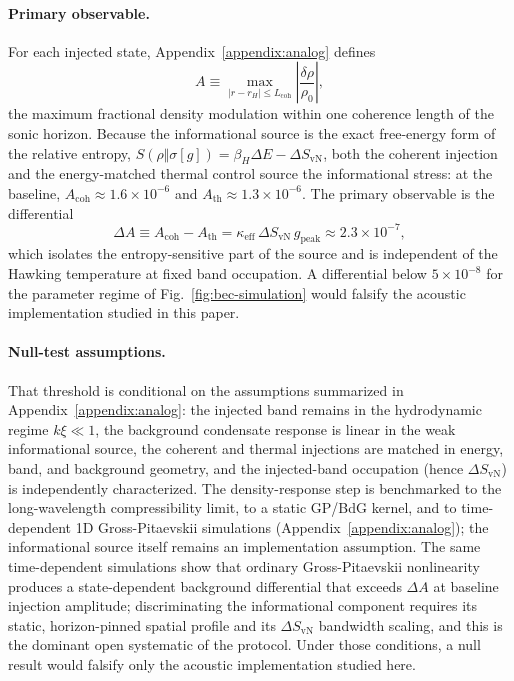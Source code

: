 \documentclass[aps,prd,twocolumn,superscriptaddress,nofootinbib,floatfix]{revtex4-2}
\begin{document}
\paragraph{Primary observable.}
For each injected state, Appendix~\ref{appendix:analog} defines
\begin{equation}
    A \equiv \max_{|r-r_H|\le L_{\mathrm{coh}}}\left|\frac{\delta \rho}{\rho_0}\right|,
\end{equation}
the maximum fractional density modulation within one coherence length of the sonic horizon. Because the informational source is the exact free-energy form of the relative entropy, $S(\rho\Vert\sigma[g]) = \beta_H \Delta E - \Delta S_{\mathrm{vN}}$, both the coherent injection and the energy-matched thermal control source the informational stress: at the baseline, $A_{\mathrm{coh}} \approx 1.6\times10^{-6}$ and $A_{\mathrm{th}} \approx 1.3\times10^{-6}$. The primary observable is the differential
\begin{equation}
    \Delta A \equiv A_{\mathrm{coh}} - A_{\mathrm{th}}
    = \kappa_{\mathrm{eff}}\,\Delta S_{\mathrm{vN}}\,g_{\mathrm{peak}}
    \approx 2.3\times10^{-7},
\end{equation}
which isolates the entropy-sensitive part of the source and is independent of the Hawking temperature at fixed band occupation. A differential below $5\times10^{-8}$ for the parameter regime of Fig.~\ref{fig:bec-simulation} would falsify the acoustic implementation studied in this paper.

\paragraph{Null-test assumptions.}
That threshold is conditional on the assumptions summarized in Appendix~\ref{appendix:analog}: the injected band remains in the hydrodynamic regime $k\xi \ll 1$, the background condensate response is linear in the weak informational source, the coherent and thermal injections are matched in energy, band, and background geometry, and the injected-band occupation (hence $\Delta S_{\mathrm{vN}}$) is independently characterized. The density-response step is benchmarked to the long-wavelength compressibility limit, to a static GP/BdG kernel, and to time-dependent 1D Gross-Pitaevskii simulations (Appendix~\ref{appendix:analog}); the informational source itself remains an implementation assumption. The same time-dependent simulations show that ordinary Gross-Pitaevskii nonlinearity produces a state-dependent background differential that exceeds $\Delta A$ at baseline injection amplitude; discriminating the informational component requires its static, horizon-pinned spatial profile and its $\Delta S_{\mathrm{vN}}$ bandwidth scaling, and this is the dominant open systematic of the protocol. Under those conditions, a null result would falsify only the acoustic implementation studied here.
\end{document}
